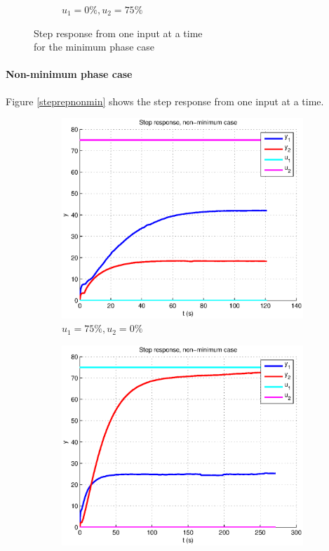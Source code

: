 \begin{figure}[h!t]
\begin{subfigure}[b]{0.45\columnwidth}
                \caption{$u_1 = 0\%, u_2 = 75\%$}
        \end{subfigure}
        \caption{Step response from one input at a time \\ for the minimum phase case} 
        \label{steprepmin}
\end{figure}

\paragraph{Non-minimum phase case} 

Figure \ref{steprepnonmin} shows the step response from one input at a time.

\begin{figure}[h!t]
        \centering
        \begin{subfigure}[b]{0.45\columnwidth}
                \includegraphics[width=\columnwidth]{fig/steprepnonmin0_75.eps}
                \caption{$u_1 = 75\%, u_2 = 0\%$}
        \end{subfigure}
        \begin{subfigure}[b]{0.45\columnwidth}
                \includegraphics[width=\columnwidth]{fig/steprepnonmin75_0.eps}

\end{subfigure}
\end{figure}
